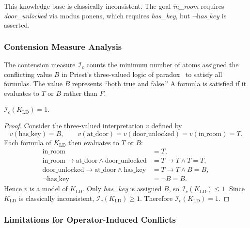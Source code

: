 This knowledge base is classically inconsistent. The goal \textit{in\_room} requires \textit{door\_unlocked} via modus ponens, which requires \textit{has\_key}, but $\neg\textit{has\_key}$ is asserted.

\subsubsection{Contension Measure Analysis}

The contension measure $\mathcal{I}_c$ counts the minimum number of atoms assigned the conflicting value $B$ in Priest's three-valued logic of paradox~\cite{Priest1979} to satisfy all formulas. The value $B$ represents ``both true and false.'' A formula is satisfied if it evaluates to $T$ or $B$ rather than $F$.
\pagebreak
\begin{prop}
    $\mathcal{I}_c(K_{\text{LD}}) = 1$.
\end{prop}
\begin{proof}
    Consider the three-valued interpretation $v$ defined by
    \begin{equation*}
        v(\text{has\_key}) = B, \qquad v(\text{at\_door}) = v(\text{door\_unlocked}) = v(\text{in\_room}) = T.
    \end{equation*}
    Each formula of $K_{\text{LD}}$ then evaluates to $T$ or $B$:
    \begin{align*}
        \text{in\_room}                                                         & = T,                           \\
        \text{in\_room} \rightarrow \text{at\_door} \land \text{door\_unlocked} & = T \rightarrow T \land T = T, \\
        \text{door\_unlocked} \rightarrow \text{at\_door} \land \text{has\_key} & = T \rightarrow T \land B = B, \\
        \neg\text{has\_key}                                                     & = \neg B = B.
    \end{align*}
    Hence $v$ is a model of $K_{\text{LD}}$. Only \textit{has\_key} is assigned $B$, so $\mathcal{I}_c(K_{\text{LD}}) \leq 1$. Since $K_{\text{LD}}$ is classically inconsistent, $\mathcal{I}_c(K_{\text{LD}}) \geq 1$. Therefore $\mathcal{I}_c(K_{\text{LD}}) = 1$.
\end{proof}

\subsubsection{Limitations for Operator-Induced Conflicts}

